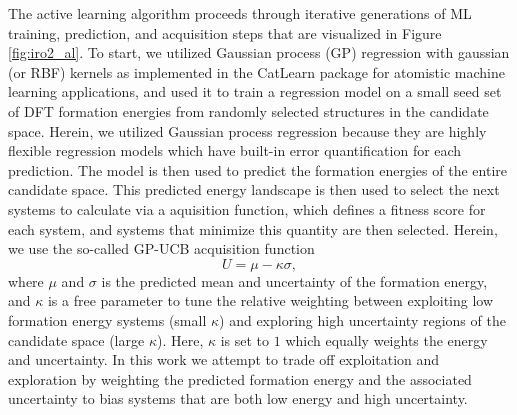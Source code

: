 %
%
The active learning algorithm proceeds through iterative generations of ML training, prediction, and acquisition steps that are visualized in Figure \ref{fig:iro2_al}.
%
To start, we utilized Gaussian process (GP) regression with gaussian (or RBF) kernels as implemented in the CatLearn\cite{hansen2019atomistic,CatLearn_Repo} package for atomistic machine learning applications, and used it to train a regression model on a small seed set of DFT formation energies from randomly selected structures in the candidate space.
%
Herein, we utilized Gaussian process regression because they are highly flexible regression models which have built-in error quantification for each prediction.
%
The model is then used to predict the formation energies of the entire candidate space.
%
This predicted energy landscape is then used to select the next systems to calculate via a aquisition function, which defines a fitness score for each system, and systems that minimize this quantity are then selected.
%
Herein, we use the so-called GP-UCB acquisition function
%
\begin{equation}
    U = \mu - \kappa \sigma,
\end{equation}
%
where $\mu$ and $\sigma$ is the predicted mean and uncertainty of the formation energy,
and $\kappa$ is a free parameter to tune the relative weighting between exploiting low formation energy systems (small $\kappa$) and exploring high uncertainty regions of the candidate space (large $\kappa$).
%
Here, $\kappa$ is set to $1$ which equally weights the energy and uncertainty.
%
In this work we attempt to trade off exploitation and exploration by weighting the predicted formation energy and the associated uncertainty to bias systems that are both low energy and high uncertainty.
%
